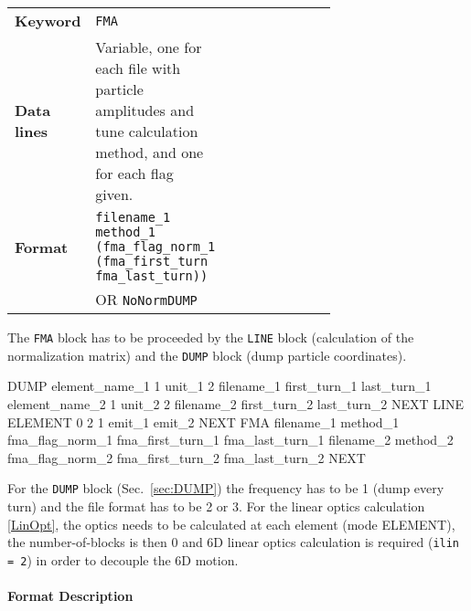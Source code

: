 \bigskip
\begin{tabular}{@{}llp{0.7\linewidth}}
    \textbf{Keyword}    & \texttt{FMA} \\
    \textbf{Data lines} & Variable, one for each file with particle amplitudes and tune calculation method, and one for each flag given. \\
    \textbf{Format}     & \texttt{filename\_1 method\_1 (fma\_flag\_norm\_1 (fma\_first\_turn fma\_last\_turn))}\\
                        & OR \texttt{NoNormDUMP}\\
\end{tabular}

\bigskip
The \texttt{FMA} block has to be proceeded by the \texttt{LINE} block (calculation of the normalization matrix) and the \texttt{DUMP} block (dump particle coordinates).
\begin{cverbatim}
DUMP
element_name_1 1 unit_1 2 filename_1 first_turn_1 last_turn_1
element_name_2 1 unit_2 2 filename_2 first_turn_2 last_turn_2
NEXT
LINE
ELEMENT  0 2 1 emit_1 emit_2
NEXT
FMA
filename_1 method_1 fma_flag_norm_1 fma_first_turn_1 fma_last_turn_1
filename_2 method_2 fma_flag_norm_2 fma_first_turn_2 fma_last_turn_2
NEXT
\end{cverbatim}
For the \texttt{DUMP} block (Sec.~\ref{sec:DUMP}) the frequency has to be 1 (dump every turn) and the file format has to be 2 or 3.
For the linear optics calculation \ref{LinOpt}, the optics needs to be calculated at each element (mode ELEMENT), the number-of-blocks is then 0 and 6D linear optics calculation is required (\texttt{ilin = 2}) in order to decouple the 6D motion. 

\paragraph{Format Description}~

